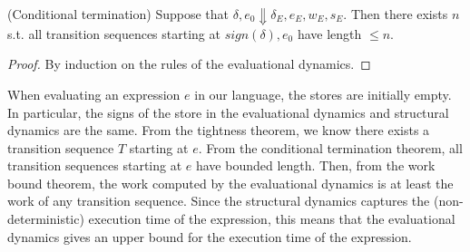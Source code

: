 \begin{theorem}
(Conditional termination) Suppose that $\delta, e_0 \Downarrow \delta_E, e_E, w_E, s_E$. Then there exists $n$ s.t. all transition sequences starting at $sign(\delta), e_0$ have length $\leq n$.
\end{theorem}

\begin{proof}
By induction on the rules of the evaluational dynamics.
\end{proof}

When evaluating an expression $e$ in our language, the stores are initially empty. In particular, the signs of the store in the evaluational dynamics and structural dynamics are the same. From the tightness theorem, we know there exists a transition sequence $T$ starting at $e$. From the conditional termination theorem, all transition sequences starting at $e$ have bounded length. Then, from the work bound theorem, the work computed by the evaluational dynamics is at least the work of any transition sequence. Since the structural dynamics captures the (non-deterministic) execution time of the expression, this means that the evaluational dynamics gives an upper bound for the execution time of the expression.

